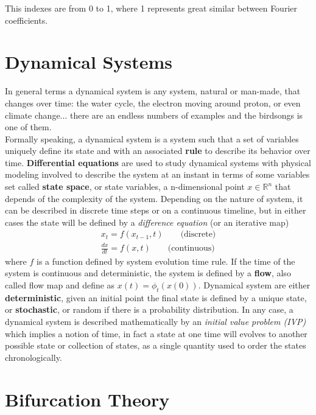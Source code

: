 This indexes are from 0 to 1, where 1 represents great similar between Fourier coefficients.


\section{Dynamical Systems}\label{sec_non_linear_dynamics}

In general terms a dynamical system is any system, natural or man-made, that changes over time: the water cycle, the electron moving around proton, or even climate change... there are an endless numbers of examples and the birdsongs is one of them.\\

Formally speaking, a dynamical system is a system such that a set of variables uniquely define its state and with an associated \textbf{rule} to describe its behavior over time. \textbf{Differential equations} are used to study dynamical systems with physical modeling involved to describe the system at an instant in terms of some variables set called \textbf{state space}, or state variables, a n-dimensional point $x\in \mathbb{R}^n$ that depends of the complexity of the system. Depending on the nature of system, it can be described in discrete time steps or on a continuous timeline, but in either cases the state will be defined by a \textit{difference equation} (or an iterative map) 
\begin{gather}\label{difference_equation}
    x_{t} = f(x_{t-1},t)  \qquad \text{(discrete)}\nonumber\\
    \frac{dx}{dt}= f(x,t) \qquad \text{(continuous)}
\end{gather}
where $f$ is a function defined by system evolution time rule. If the time of the system is continuous and deterministic, the system is defined by a \textbf{flow}, also called flow map and define as $x(t)=\phi_t(x(0))$. Dynamical system are either \textbf{deterministic}, given an initial point the final state is defined by a unique state, or \textbf{stochastic}, or random if there is a probability distribution. In any case, a dynamical system is described mathematically by an \textit{initial value problem (IVP)} which implies a notion of time, in fact a state at one time will evolves to another possible state or collection of states, as a single quantity used to order the states chronologically. \cite{scholarpedia}


\section{Bifurcation Theory}

